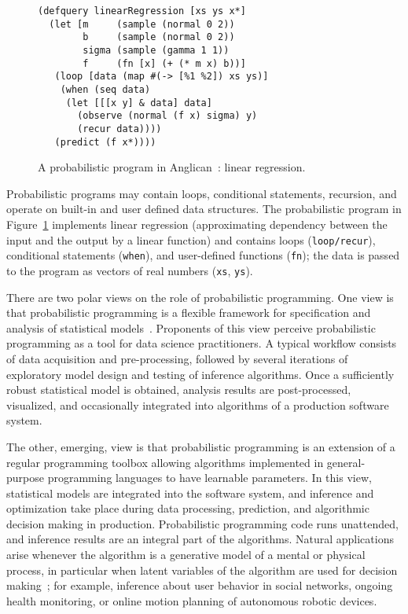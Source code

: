 \documentclass[sigplan,10pt,screen]{acmart}
\begin{document}
\begin{sloppypar}
  \begin{figure}
    \begin{lstlisting}[language=Anglican]
(defquery linearRegression [xs ys x*]
  (let [m     (sample (normal 0 2))
        b     (sample (normal 0 2))
        sigma (sample (gamma 1 1))
        f     (fn [x] (+ (* m x) b))]
   (loop [data (map #(-> [%1 %2]) xs ys)]
    (when (seq data)
     (let [[[x y] & data] data] 
       (observe (normal (f x) sigma) y)
       (recur data))))
   (predict (f x*))))
    \end{lstlisting}
    \caption{A probabilistic program in Anglican~\cite{TMY+16}:
    linear regression.}
    \label{fig:linreg-anglican}
  \end{figure}
  Probabilistic programs may contain loops, conditional
  statements, recursion, and operate on built-in and user
  defined data structures. The probabilistic program in
  Figure~\ref{fig:linreg-anglican} implements linear regression
  (approximating dependency between the input and the output by
  a linear function) and contains loops
  (\lstinline[language=Anglican]{loop/recur}), conditional
  statements (\lstinline[language=Anglican]{when}), and
  user-defined functions (\lstinline[language=Anglican]{fn});
  the data is passed to the program as vectors of real numbers
  (\lstinline[language=Anglican]{xs}, \lstinline[language=Anglican]{ys}).
  
  There are two polar views on the role of probabilistic
  programming.  One view is that probabilistic programming is
  a flexible framework for specification and analysis of
  statistical models~\cite{WSG11,TMY+16,GXG18}.  Proponents of
  this view perceive probabilistic programming as a tool for
  data science practitioners. A typical workflow consists of
  data acquisition and pre-processing, followed by several
  iterations of exploratory model design and testing of
  inference algorithms. Once a sufficiently robust statistical
  model is obtained, analysis results are post-processed,
  visualized, and occasionally integrated into algorithms of a
  production software system.

  The other, emerging, view is that probabilistic programming
  is an extension of a regular programming toolbox allowing
  algorithms implemented in general-purpose programming
  languages to have learnable parameters. In this view,
  statistical models are integrated into the software system,
  and inference and optimization take place during data
  processing, prediction, and algorithmic decision making in
  production.  Probabilistic programming code runs unattended,
  and inference results are an integral part of the
  algorithms. Natural applications arise whenever the algorithm
  is a generative model of a mental or physical process, in
  particular when latent variables of the algorithm are used for
  decision making~\cite{GT+16,WBD+19}; for example, inference
  about user behavior in social networks, ongoing health
  monitoring, or online motion planning of autonomous robotic
  devices.


\end{sloppypar}
\end{document}
